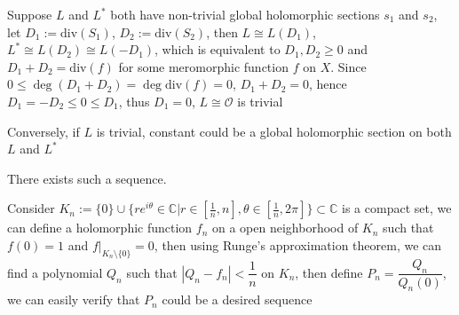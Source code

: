 \documentclass[../main.tex]{subfiles}
\begin{document}
\begin{problem}
Suppose $L$ and $L^{*}$ both have non-trivial global holomorphic sections $s_{1}$ and $s_{2}$, let $D_{1}:=\mathrm{div}(S_{1})$, $D_{2}:=\mathrm{div}(S_{2})$, then $L\cong L(D_{1})$, $L^{*}\cong L(D_{2})\cong L(-D_{1})$, which is equivalent to $D_{1},D_{2}\geq 0$ and $D_{1}+D_{2}=\mathrm{div}(f)$ for some meromorphic function $f$ on $X$. Since $0\leq\deg(D_{1}+D_{2})=\deg\mathrm{div}(f)=0$, $D_{1}+D_{2}=0$, hence $D_{1}=-D_{2}\leq0\leq D_{1}$, thus $D_{1}=0$, $L\cong \mathcal{O}$ is trivial \par
Conversely, if $L$ is trivial, constant could be a global holomorphic section on both $L$ and $L^{*}$
\end{problem}

\begin{problem}
There exists such a sequence. \par
Consider $K_{n}:=\{0\}\cup\{re^{i\theta}\in\mathbb{C}|r\in[\frac{1}{n},n], \theta\in[\frac{1}{n},2\pi]\}\subset\mathbb{C}$ is a compact set, we can define a holomorphic function $f_{n}$ on a open neighborhood of $K_n$ such that $f(0)=1$ and $f|_{K_n\setminus\{0\}}=0$, then using Runge's approximation theorem, we can find a polynomial $Q_{n}$ such that $|Q_n-f_n|<\dfrac{1}{n}$ on $K_n$, then define $P_n=\dfrac{Q_n}{Q_n(0)}$, we can easily verify that $P_n$ could be a desired sequence
\end{problem}
\end{document}
